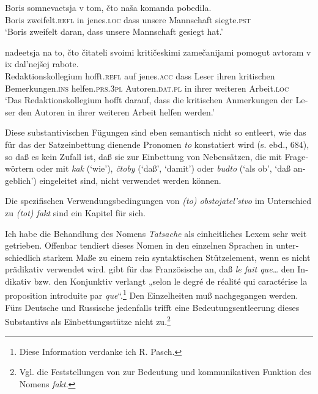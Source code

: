 \documentclass[output=paper]{langscibook}
\begin{document}
\begin{otherlanguage}{german}
{\ea \label{ex:zi83:f69i}
    \gll Boris somnevaetsja v tom, čto naša komanda pobedila. \\
    Boris zweifelt.\textsc{refl} in jenes.\textsc{loc}  dass unsere Mannschaft siegte.\textsc{pst} \\
    \glt ‘Boris zweifelt daran, dass unsere Mannschaft gesiegt hat.’
    
    
\ex \label{ex:zi83:f69ii}
     nadeetsja na to, čto čitateli svoimi kritičeskimi zamečanijami pomogut avtoram v ix dal’nejšej rabote. \\
    Redaktionskollegium hofft.\textsc{refl} auf jenes.\textsc{acc} dass  Leser ihren kritischen Bemerkungen.\textsc{ins}  helfen.\textsc{prs}.3\textsc{pl}  Autoren.\textsc{dat}.\textsc{pl} in ihrer weiteren Arbeit.\textsc{loc} \\
    \glt ‘Das Redaktionskollegium hofft darauf, dass die kritischen Anmerkungen der Leser den Autoren in ihrer weiteren Arbeit helfen werden.’

\z

\noindent Diese substantivischen Fügungen sind eben semantisch nicht so entleert, wie das für das der Satzeinbettung dienende Pronomen \textit{to} konstatiert wird (s. ebd., 684), so daß es kein Zufall ist, daß sie zur Einbettung von Nebensätzen, die mit Fragewörtern oder mit \textit{kak} (‘wie’), \textit{čtoby} (‘daß’, ‘damit’) oder \textit{budto} (‘als ob’, ‘daß angeblich’) eingeleitet sind, nicht verwendet werden können. 

\noindent Die spezifischen Verwendungsbedingungen von \textit{(to) obstojatel’stvo} im Unterschied zu \textit{(tot) fakt} sind ein Kapitel für sich.}

Ich habe die Behandlung des Nomens \textit{Tatsache} als einheitliches Lexem sehr weit getrieben. Offenbar tendiert dieses Nomen in den einzelnen Sprachen in unterschiedlich starkem Maße zu einem rein syntaktischen Stützelement, wenn es nicht prädikativ verwendet wird. \citet[Bd. 2, 1900]{robert1960dictionaire-alphabetique-et-analogique-de-la-langue-fracaise:-tome-second} gibt für das Französische an, daß \textit{le fait que…} den Indikativ bzw. den Konjunktiv verlangt „selon le degré de réalité qui caractérise la proposition introduite par \textit{que}“.\footnote{Diese Information verdanke ich R. Pasch.} Den Einzelheiten muß nachgegangen werden. Fürs Deutsche und Russische jedenfalls trifft eine Bedeutungsentleerung dieses Substantivs als Einbettungsstütze nicht zu.\footnote{Vgl. die Feststellungen von \citet{arutjunovasokrovennaja-svjazka-k-probleme-predikativnogo-otnosenija} zur Bedeutung und kommunikativen Funktion des Nomens \textit{fakt}.}


\end{otherlanguage}
\end{document}
